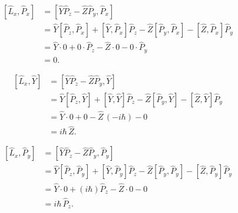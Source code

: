 \documentclass{article}
\begin{document}
\[
\begin{aligned}
[\hat{L}_x, \hat{P}_x] &= [\hat{Y}\hat{P}_z - \hat{Z}\hat{P}_y,\hat{P}_x]\\[1mm]
&= \hat{Y}[\hat{P}_z,\hat{P}_x] + [\hat{Y},\hat{P}_x]\hat{P}_z - \hat{Z}[\hat{P}_y,\hat{P}_x] - [\hat{Z},\hat{P}_x]\hat{P}_y\\[1mm]
&= \hat{Y}\cdot 0 + 0\cdot\hat{P}_z - \hat{Z}\cdot 0 - 0\cdot\hat{P}_y\\[1mm]
&= 0.
\end{aligned}
\]

\[
\begin{aligned}
[\hat{L}_x, \hat{Y}] &= [\hat{Y}\hat{P}_z - \hat{Z}\hat{P}_y, \hat{Y}]\\[1mm]
&= \hat{Y}[\hat{P}_z,\hat{Y}] + [\hat{Y},\hat{Y}]\hat{P}_z - \hat{Z}[\hat{P}_y,\hat{Y}] - [\hat{Z},\hat{Y}]\hat{P}_y\\[1mm]
&= \hat{Y}\cdot 0 + 0 - \hat{Z}\,(-i\hbar) - 0\\[1mm]
&= i\hbar\,\hat{Z}.
\end{aligned}
\]

\[
\begin{aligned}
[\hat{L}_x, \hat{P}_y] &= [\hat{Y}\hat{P}_z - \hat{Z}\hat{P}_y, \hat{P}_y]\\[1mm]
&= \hat{Y}[\hat{P}_z,\hat{P}_y] + [\hat{Y},\hat{P}_y]\hat{P}_z - \hat{Z}[\hat{P}_y,\hat{P}_y] - [\hat{Z},\hat{P}_y]\hat{P}_y\\[1mm]
&= \hat{Y}\cdot 0 + (i\hbar)\hat{P}_z - \hat{Z}\cdot 0 - 0\\[1mm]
&= i\hbar\,\hat{P}_z.
\end{aligned}
\]
\end{document}
